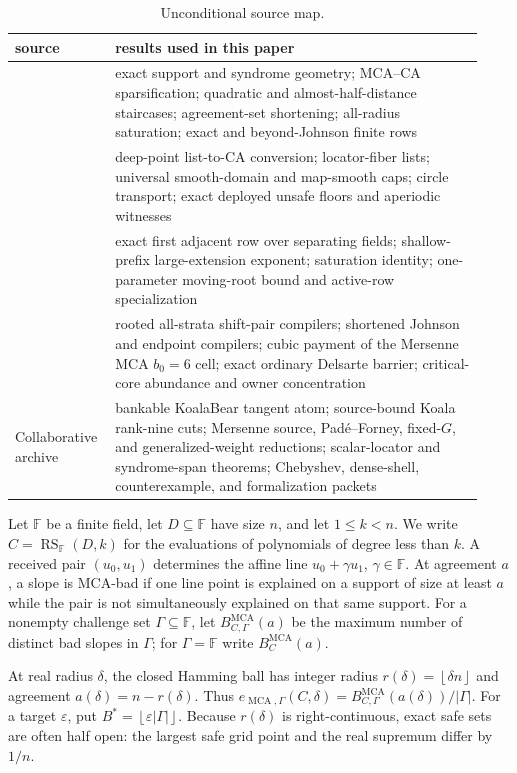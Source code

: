 \documentclass[11pt,a4paper]{amsart}
\numberwithin{equation}{section}
\theoremstyle{remark}
\DeclareMathOperator{\RS}{RS}
\DeclareMathOperator{\MCA}{MCA}
\newcommand{\F}{\mathbb F}
\newcommand{\eps}{\varepsilon}
\newcommand{\floor}[1]{\left\lfloor#1\right\rfloor}
\begin{document}
\begin{table}[ht]
\centering
\caption{Unconditional source map.}
\label{tab:source-map}
\small
\begin{tabular}{@{}p{0.18\linewidth}p{0.75\linewidth}@{}}
\toprule
source & results used in this paper\\
\midrule
\cite{ChoShort26} & exact support and syndrome geometry; MCA--CA sparsification; quadratic and almost-half-distance staircases; agreement-set shortening; all-radius saturation; exact and beyond-Johnson finite rows\\
\cite{ChoCap26} & deep-point list-to-CA conversion; locator-fiber lists; universal smooth-domain and map-smooth caps; circle transport; exact deployed unsafe floors and aperiodic witnesses\\
\cite{ChoGF26} & exact first adjacent row over separating fields; shallow-prefix large-extension exponent; saturation identity; one-parameter moving-root bound and active-row specialization\\
\cite{ChoComp26} & rooted all-strata shift-pair compilers; shortened Johnson and endpoint compilers; cubic payment of the Mersenne MCA $b_0=6$ cell; exact ordinary Delsarte barrier; critical-core abundance and owner concentration\\
Collaborative archive & bankable KoalaBear tangent atom; source-bound Koala rank-nine cuts; Mersenne source, Pad\'e--Forney, fixed-$G$, and generalized-weight reductions; scalar-locator and syndrome-span theorems; Chebyshev, dense-shell, counterexample, and formalization packets\\
\bottomrule
\end{tabular}
\end{table}

Let $\F$ be a finite field, let $D\subseteq\F$ have size $n$, and let $1\le k<n$.  We write $C=\RS_{\F}(D,k)$ for the evaluations of polynomials of degree less than $k$.  A received pair $(u_0,u_1)$ determines the affine line $u_0+\gamma u_1$, $\gamma\in\F$.  At agreement $a$, a slope is MCA-bad if one line point is explained on a support of size at least $a$ while the pair is not simultaneously explained on that same support.  For a nonempty challenge set $\Gamma\subseteq\F$, let $B_{C,\Gamma}^{\MCA}(a)$ be the maximum number of distinct bad slopes in $\Gamma$; for $\Gamma=\F$ write $B_C^{\MCA}(a)$.

At real radius $\delta$, the closed Hamming ball has integer radius $r(\delta)=\floor{\delta n}$ and agreement $a(\delta)=n-r(\delta)$.  Thus $e_{\MCA,\Gamma}(C,\delta)=B_{C,\Gamma}^{\MCA}(a(\delta))/|\Gamma|$.  For a target $\eps$, put $B^*=\floor{\eps|\Gamma|}$.  Because $r(\delta)$ is right-continuous, exact safe sets are often half open: the largest safe grid point and the real supremum differ by $1/n$.
\end{document}
